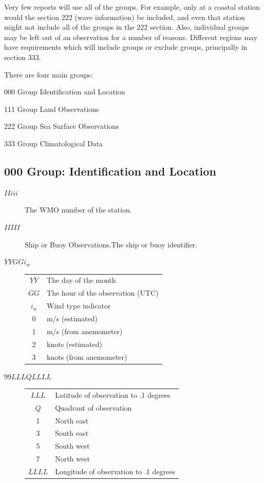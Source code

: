 \documentclass{article}
\begin{document}
Very few reports will use all of the groups. For example, only at a coastal station would the section 222 (wave
information) be included, and even that station might not include all of the groups in the 222
section. Also, individual groups may be left out of an observation for a number of reasons.
Different regions may have requirements which will include groups or exclude groups,
principally in section 333.


There are four main groups:

\begin{description}
\item{000 Group} Identification and Location
\item{111 Group} Land Observations
\item{222 Group} Sea Surface Observations
\item{333 Group} Climatological Data
\end{description}

\subsection{000 Group: Identification and Location}

\begin{description}
\item[$IIiii$] The WMO number of the station\cite{ogimet}.
\item[$IIIII$] Ship or Buoy Observations.The ship or buoy identifier.
\item[$YYGGi_w$]
  \begin{tabular}{cl}
    $YY$ & The day of the month\\
    $GG$ & The hour of the observation (UTC)\\
    $i_w$ & Wind type indicator\\
    0  & m/s (estimated)\\
    1  & m/s (from anemometer)\\
    2  & knots (estimated)\\
    3  & knots (from anemometer)
  \end{tabular}
\item[$99LLL QLLLL$]
  \begin{tabular}{cl}
    $LLL$ & Latitude of observation to .1 degrees\\
    $Q$ & Quadrant of observation\\
    1 & North east \\
    3 & South east\\
    5 & South west\\
    7 & North west\\
    $LLLL$ & Longitude of  observation to .1 degrees
  \end{tabular}
\end{description}
\end{document}
